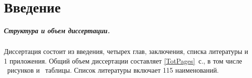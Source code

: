 
\chapter*{Введение}                         %



\paragraph*{Структура и объем диссертации.}
Диссертация состоит из введения,
четырех глав, заключения, списка литературы и 1 приложения.
Общий объем диссертации составляет \ref*{TotPages}~с.,
в том числе \totalfigures{}~рисунков и \totaltables{}~таблицы.
Список литературы включает 115 наименований.
